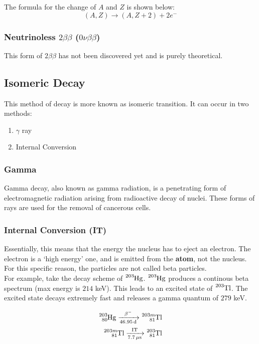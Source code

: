 \documentclass{article}
\begin{document}
\begin{multicols*}{2}
    The formula for the change of $A$ and $Z$ is shown below:
    \[
      \left(A, Z\right) \rightarrow \left(A, Z + 2\right) + 2e^{-}
    \]

    \subsubsection{Neutrinoless $2\beta\beta$ ($0\nu\beta\beta$)}
    This form of $2\beta\beta$ has not been discovered yet and is purely theoretical.
      

    \subsection{Isomeric Decay}
    This method of decay is more known as isomeric transition. It can occur
    in two methods:
    \begin{enumerate}
      \item $\gamma$ ray
      \item Internal Conversion
    \end{enumerate}
    \subsubsection{Gamma}
    Gamma decay, also known as gamma radiation, is a penetrating form of
    electromagnetic radiation arising from radioactive decay of nuclei. These
    forms of rays are used for the removal of cancerous cells.
    
    \subsubsection{Internal Conversion (IT)}
    Essentially, this means that the energy the nucleus has to eject an electron.
    The electron is a `high energy' one, and is emitted from the \textbf{atom},
    not the nucleus. For this specific reason, the particles are not called
    beta particles.\\

    For example, take the decay scheme of $\ce{^{203}Hg}$. $\ce{^{203}Hg}$ produces
    a continous beta spectrum (max energy is $214$ keV). This leads to an excited
    state of $\ce{^{203}Tl}$. The excited state decays extremely fast and releases
    a gamma quantum of $279$ keV.

    \begin{equation*}
      \begin{split}
        \ce{^{203}_{80}Hg ->[\beta^{-}][46.95 d] ^{203m}_{81}Tl} \\
        \ce{^{203m}_{81}Tl ->[IT][7.7 \mu{s}] ^{203}_{81}Tl} \\
      \end{split}
    \end{equation*}

\end{multicols*}
\end{document}
